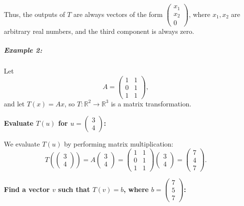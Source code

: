 \documentclass[a4paper,12pt]{article}
\begin{document}
Thus, the outputs of \( T \) are always vectors of the form \( \begin{pmatrix} x_1 \\ x_2 \\ 0 \end{pmatrix} \), where \( x_1, x_2 \) are arbitrary real numbers, and the third component is always zero.

\subparagraph{Example 2:}

Let 
\[
A = \begin{pmatrix} 1 & 1 \\ 0 & 1 \\ 1 & 1 \end{pmatrix},
\]
and let \( T(x) = Ax \), so \( T: \mathbb{R}^2 \to \mathbb{R}^3 \) is a matrix transformation.

\textbf{Evaluate \( T(u) \) for \( u = \begin{pmatrix} 3 \\ 4 \end{pmatrix} \):}

We evaluate \( T(u) \) by performing matrix multiplication:
\[
T\left( \begin{pmatrix} 3 \\ 4 \end{pmatrix} \right) = A \begin{pmatrix} 3 \\ 4 \end{pmatrix} = \begin{pmatrix} 1 & 1 \\ 0 & 1 \\ 1 & 1 \end{pmatrix} \begin{pmatrix} 3 \\ 4 \end{pmatrix} = \begin{pmatrix} 7 \\ 4 \\ 7 \end{pmatrix}.
\]

\textbf{Find a vector \( v \) such that \( T(v) = b \), where \( b = \begin{pmatrix} 7 \\ 5 \\ 7 \end{pmatrix} \):}
\end{document}
